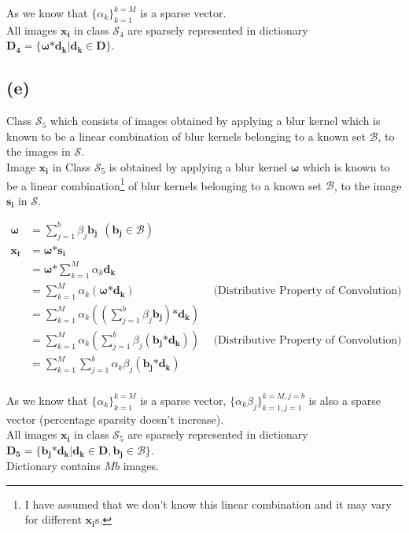 \documentclass[fleqn, 11pt]{article}
\newcommand{\bs}[1]{\boldsymbol{#1}}
\begin{document}
As we know that $\{\alpha_k\}_{k=1}^{k=M}$ is a sparse vector. \\
All images $\bs{x_i}$ in class $\mathcal{S}_4$ are sparsely represented in dictionary $\bs{D_4} = \{\bs{\omega} \bs{*} \bs{d_k} | \bs{d_k} \in \bs{D}\}$. \\

\medskip

\subsection*{(e)}
Class $\mathcal{S}_5$ which consists of images obtained by applying a blur kernel which is known to be a linear combination of blur kernels belonging to a known set $\mathcal{B}$, to the images in $\mathcal{S}$. \\
Image $\bs{x_i}$ in Class $\mathcal{S}_5$ is obtained by applying a blur kernel $\bs{\omega}$ which is known to be a linear combination\footnote{I have assumed that we don't know this linear combination and it may vary for different $\bs{x_i}$s.} of blur kernels belonging to a known set $\mathcal{B}$, to the image $\bs{s_i}$ in $\mathcal{S}$.

\begin{equation*}
    \begin{aligned}
        \bs{\omega} &= \sum_{j=1}^{b} \beta_j \bs{b_j} \ \  (\bs{b_j} \in \mathcal{B}) \\
        \bs{x_i} &= \bs{\omega} \bs{*} \bs{s_i} \\
            &= \bs{\omega} \bs{*} \sum_{k=1}^{M} \alpha_k \bs{d_k} \\
            &= \sum_{k=1}^{M} \alpha_k (\bs{\omega} \bs{*} \bs{d_k}) &\ \ (\text{Distributive Property of Convolution)}\\
            &= \sum_{k=1}^{M} \alpha_k ((\sum_{j=1}^{b} \beta_j \bs{b_j}) \bs{*} \bs{d_k}) \\
            &= \sum_{k=1}^{M} \alpha_k (\sum_{j=1}^{b} \beta_j (\bs{b_j} \bs{*} \bs{d_k})) &\ \ (\text{Distributive Property of Convolution)}\\
            &= \sum_{k=1}^{M} \sum_{j=1}^{b} \alpha_k \beta_j (\bs{b_j} \bs{*} \bs{d_k}) \\
    \end{aligned}
\end{equation*}

As we know that $\{\alpha_k\}_{k=1}^{k=M}$ is a sparse vector, $\{\alpha_k \beta_j\}_{k=1, j=1}^{k=M, j=b}$ is also a sparse vector (percentage sparsity doesn't increase). \\
All images $\bs{x_i}$ in class $\mathcal{S}_5$ are sparsely represented in dictionary $\bs{D_5} = \{\bs{b_j} \bs{*} \bs{d_k} | \bs{d_k} \in \bs{D}, \bs{b_j} \in \mathcal{B} \}$. \\ Dictionary contains $Mb$ images.
\end{document}
